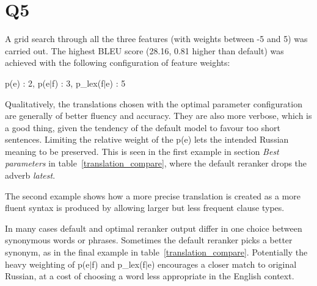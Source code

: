 \section*{Q5}

A grid search through all the three features (with weights between -5 and 5) was carried out. The highest BLEU score (28.16, 0.81 higher than default) was achieved with the following configuration of feature weights:

\centerline{p(e) : 2,    p(e$|$f) : 3,    p\_lex(f$|$e) : 5}

Qualitatively, the translations chosen with the optimal parameter configuration are generally of better fluency and accuracy. They are also more verbose, which is a good thing, given the tendency of the default model to favour too short sentences. Limiting the relative weight of the p(e) lets the intended Russian meaning to be preserved. This is seen in the first example in section \textit{Best parameters} in table~\ref{translation_compare}, where the default reranker drops the adverb \textit{latest}.

The second example shows how a more precise translation is created as a more fluent syntax is produced by allowing larger but less frequent clause types.
   
In many cases default and optimal reranker output differ in one choice between synonymous words or phrases. Sometimes the default reranker picks a better synonym, as in the final example in table~\ref{translation_compare}. Potentially the heavy weighting of p(e$|$f) and p\_lex(f$|$e) encourages a closer match to original Russian, at a cost of choosing a word less appropriate in the English context.